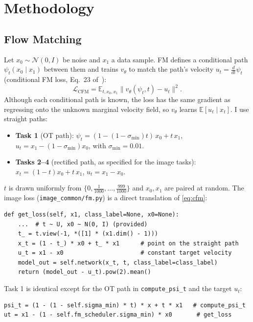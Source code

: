 \section{Methodology}
\label{sec:method}

\subsection{Flow Matching}
\label{sec:fm}
Let $x_0\sim\mathcal N(0,I)$ be noise and $x_1$ a data sample.
FM defines a conditional path $\psi_t(x_0\mid x_1)$ between them and trains $v_\theta$ to match the path's velocity $u_t=\tfrac{d}{dt}\psi_t$ (conditional FM loss, Eq.~23 of~\cite{lipman2023flow}):
\begin{equation}
  \mathcal L_{\text{CFM}} = \mathbb E_{t,x_0,x_1}\big\|v_\theta(\psi_t,t) - u_t\big\|^2 .
  \label{eq:cfm}
\end{equation}
Although each conditional path is known, the loss has the same gradient as regressing onto the unknown marginal velocity field, so $v_\theta$ learns $\mathbb E[u_t\mid x_t]$.
I use straight paths:
\begin{itemize}
  \item \textbf{Task 1} (OT path): $\psi_t=(1-(1-\sigma_{\min})t)\,x_0+t\,x_1$, $u_t=x_1-(1-\sigma_{\min})x_0$, with $\sigma_{\min}=0.01$.
  \item \textbf{Tasks 2--4} (rectified path, as specified for the image tasks): $x_t=(1-t)x_0+t\,x_1$, $u_t=x_1-x_0$.
\end{itemize}
$t$ is drawn uniformly from $\{0,\tfrac{1}{1000},\dots,\tfrac{999}{1000}\}$ and $x_0,x_1$ are paired at random.
The image loss (\texttt{image\_common/fm.py}) is a direct translation of \cref{eq:cfm}:
\begin{lstlisting}
def get_loss(self, x1, class_label=None, x0=None):
    ...  # t ~ U, x0 ~ N(0, I) (provided)
    t_ = t.view(-1, *([1] * (x1.dim() - 1)))
    x_t = (1 - t_) * x0 + t_ * x1      # point on the straight path
    u_t = x1 - x0                      # constant target velocity
    model_out = self.network(x_t, t, class_label=class_label)
    return (model_out - u_t).pow(2).mean()
\end{lstlisting}
Task 1 is identical except for the OT path in \texttt{compute\_psi\_t} and the target $u_t$:
\begin{lstlisting}
psi_t = (1 - (1 - self.sigma_min) * t) * x + t * x1   # compute_psi_t
ut = x1 - (1 - self.fm_scheduler.sigma_min) * x0       # get_loss
\end{lstlisting}

